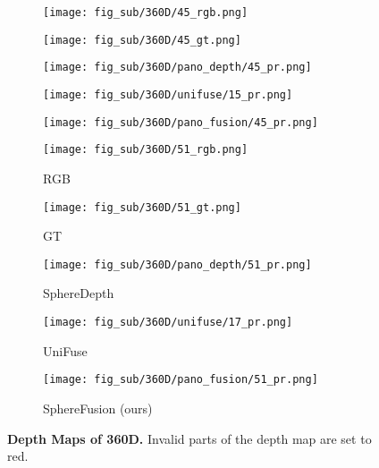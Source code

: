\begin{figure*}[t]
	\begin{subfigure}{0.18\linewidth}
		\texttt{[image: fig\_sub/360D/45\_rgb.png]}
	\end{subfigure}
	\begin{subfigure}{0.18\linewidth}
		\texttt{[image: fig\_sub/360D/45\_gt.png]}
	\end{subfigure}
	\begin{subfigure}{0.18\linewidth}
		\texttt{[image: fig\_sub/360D/pano\_depth/45\_pr.png]}
	\end{subfigure}
	\begin{subfigure}{0.18\linewidth}
		\texttt{[image: fig\_sub/360D/unifuse/15\_pr.png]}
	\end{subfigure}
	\begin{subfigure}{0.18\linewidth}
		\texttt{[image: fig\_sub/360D/pano\_fusion/45\_pr.png]}
	\end{subfigure}
	
	\vspace{1pt}

	\begin{subfigure}{0.18\linewidth}
		\texttt{[image: fig\_sub/360D/51\_rgb.png]}
		\caption{RGB}
	\end{subfigure}
	\begin{subfigure}{0.18\linewidth}
		\texttt{[image: fig\_sub/360D/51\_gt.png]}
		\caption{GT}
	\end{subfigure}
	\begin{subfigure}{0.18\linewidth}
		\texttt{[image: fig\_sub/360D/pano\_depth/51\_pr.png]}
		\caption{SphereDepth \cite{yan2022spheredepth}}
	\end{subfigure}
	\begin{subfigure}{0.18\linewidth}
		\texttt{[image: fig\_sub/360D/unifuse/17\_pr.png]}
		\caption{UniFuse \cite{jiang2021unifuse}}
	\end{subfigure}
	\begin{subfigure}{0.18\linewidth}
		\texttt{[image: fig\_sub/360D/pano\_fusion/51\_pr.png]}
		\caption{SphereFusion (ours)}
	\end{subfigure}

	
	\caption{
		\textbf{Depth Maps of 360D.} Invalid parts of the depth map are set to red. 
	}
	\label{fig:3d60_depth}
    \vspace{-1.0em}
\end{figure*}

